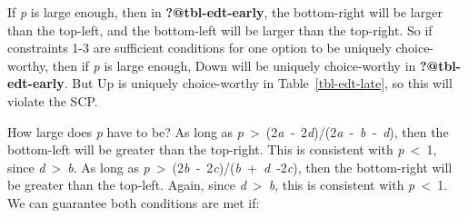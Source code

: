 \documentclass[
  10pt,
  letterpaper,
  DIV=11,
  numbers=noendperiod,
  twoside]{scrartcl}
\begin{document}
\begin{table}

\caption{\label{tbl-edt}Payout tables for Figure~\ref{fig-edt}.}

\begin{minipage}[t]{0.50\linewidth}



\end{minipage}%
%
\begin{minipage}[t]{0.50\linewidth}



\end{minipage}%

\end{table}%

If \emph{p} is large enough, then in \textbf{?@tbl-edt-early}, the
bottom-right will be larger than the top-left, and the bottom-left will
be larger than the top-right. So if constraints 1-3 are sufficient
conditions for one option to be uniquely choice-worthy, then if \emph{p}
is large enough, Down will be uniquely choice-worthy in
\textbf{?@tbl-edt-early}. But Up is uniquely choice-worthy in
Table~\ref{tbl-edt-late}, so this will violate the SCP.

How large does \emph{p} have to be? As long as
\emph{p}~\textgreater~(2\emph{a}~‑~2\emph{d})/(2\emph{a}~‑~\emph{b}~‑~\emph{d}),
then the bottom-left will be greater than the top-right. This is
consistent with \emph{p}~\textless~1, since
\emph{d}~\textgreater~\emph{b}. As long as
\emph{p}~\textgreater~(2\emph{b}~‑~2\emph{c})/(\emph{b}~+~\emph{d}~‑2\emph{c}),
then the bottom-right will be greater than the top-left. Again, since
\emph{d}~\textgreater~\emph{b}, this is consistent with
\emph{p}~\textless~1. We can guarantee both conditions are met if:
\end{document}
